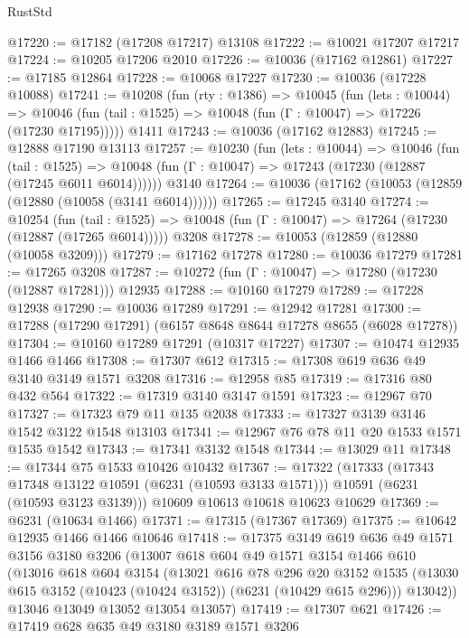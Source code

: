\begin{lexlean}{RustStd}
\begin{coremodule}
{{@17220 := @17182 (@17208 @17217) @13108
@17222 := @10021 @17207 @17217
@17224 := @10205 @17206 @2010
@17226 := @10036 (@17162 @12861)
@17227 := @17185 @12864
@17228 := @10068 @17227
@17230 := @10036 (@17228 @10088)
@17241 := @10208
    (fun (rty : @1386) =>
    @10045
      (fun (lets : @10044) =>
      @10046 (fun (tail : @1525) => @10048 (fun (Γ : @10047) => @17226 (@17230 @17195)))))
    @1411
@17243 := @10036 (@17162 @12883)
@17245 := @12888 @17190 @13113
@17257 := @10230
    (fun (lets : @10044) =>
    @10046
      (fun (tail : @1525) =>
      @10048 (fun (Γ : @10047) => @17243 (@17230 (@12887 (@17245 @6011 @6014))))))
    @3140
@17264 := @10036 (@17162 (@10053 (@12859 (@12880 (@10058 (@3141 @6014))))))
@17265 := @17245 @3140
@17274 := @10254
    (fun (tail : @1525) => @10048 (fun (Γ : @10047) => @17264 (@17230 (@12887 (@17265 @6014)))))
    @3208
@17278 := @10053 (@12859 (@12880 (@10058 @3209)))
@17279 := @17162 @17278
@17280 := @10036 @17279
@17281 := @17265 @3208
@17287 := @10272 (fun (Γ : @10047) => @17280 (@17230 (@12887 @17281))) @12935
@17288 := @10160 @17279
@17289 := @17228 @12938
@17290 := @10036 @17289
@17291 := @12942 @17281
@17300 := @17288 (@17290 @17291) (@6157 @8648 @8644 @17278 @8655 (@6028 @17278))
@17304 := @10160 @17289 @17291 (@10317 @17227)
@17307 := @10474 @12935 @1466 @1466
@17308 := @17307 @612
@17315 := @17308 @619 @636 @49 @3140 @3149 @1571 @3208
@17316 := @12958 @85
@17319 := @17316 @80 @432 @564
@17322 := @17319 @3140 @3147 @1591
@17323 := @12967 @70
@17327 := @17323 @79 @11 @135 @2038
@17333 := @17327 @3139 @3146 @1542 @3122 @1548 @13103
@17341 := @12967 @76 @78 @11 @20 @1533 @1571 @1535 @1542
@17343 := @17341 @3132 @1548
@17344 := @13029 @11
@17348 := @17344 @75 @1533 @10426 @10432
@17367 := @17322
    (@17333
      (@17343 @17348 @13122 @10591 (@6231 (@10593 @3133 @1571)))
      @10591
      (@6231 (@10593 @3123 @3139)))
    @10609
    @10613
    @10618
    @10623
    @10629
@17369 := @6231 (@10634 @1466)
@17371 := @17315 (@17367 @17369)
@17375 := @10642 @12935 @1466 @1466 @10646
@17418 := @17375
    @3149
    @619
    @636
    @49
    @1571
    @3156
    @3180
    @3206
    (@13007
      @618
      @604
      @49
      @1571
      @3154
      @1466
      @610
      (@13016
        @618
        @604
        @3154
        (@13021
          @616
          @78
          @296
          @20
          @3152
          @1535
          (@13030 @615 @3152 (@10423 (@10424 @3152)) (@6231 (@10429 @615 @296)))
          @13042))
      @13046
      @13049
      @13052
      @13054
      @13057)
@17419 := @17307 @621
@17426 := @17419 @628 @635 @49 @3180 @3189 @1571 @3206
}}
\end{coremodule}
\end{lexlean}
